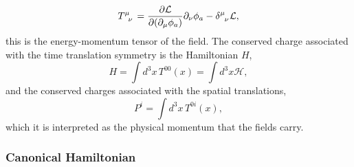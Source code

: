 \documentclass[11pt,a4paper,twoside,pdf]{article}
\numberwithin{equation}{section}
\begin{document}
\begin{equation}
    \tensor{T}{^\mu_\nu} = \frac{\partial \mathcal{L}}{\partial (\partial_\mu \phi_a)} 
    \partial_\nu \phi_a - \tensor{\delta}{^\mu_\nu} \mathcal{L},
\end{equation}
this is the energy-momentum tensor of the field. The conserved charge associated with
the time translation symmetry is the Hamiltonian \(H\), 
\begin{equation}
    H = \int d^3x \, T^{00}(x) = \int d^3x \mathcal{H},
    \label{eq:energy_momentum_hamiltonian}
\end{equation}  
and the conserved charges associated with the spatial translations,
\begin{equation}
    P^i = \int d^3x \, T^{0i}(x),
\end{equation}
which it is interpreted as the physical momentum that the fields carry.

\subsubsection{Canonical Hamiltonian}\label{sec:canonical_hamiltonian}
\end{document}
